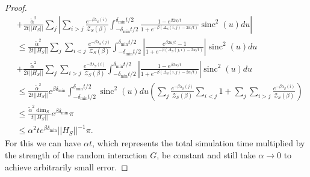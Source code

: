 \documentclass[
 amsmath,amssymb,
 aps,
onecolumn, 
nofootinbib]{revtex4-2}
\newcommand{\abs}[1]{\left| #1 \right|}
\newcommand{\norm}[1]{\left|\left| #1 \right|\right|}
\newcommand{\partfun}{\mathcal{Z}}
\DeclareMathOperator{\sinc}{sinc}
\begin{document}
\begin{proof}
\begin{align}
        &+ \frac{\widetilde{\alpha}^2}{2 t \norm{H_S}} \sum_j  \abs{\sum_{i > j} \frac{e^{-\beta \lambda_S(i)}}{\partfun_S(\beta)} \int_{-\delta_{\min} t /2 }^{\delta_{\min} t/ 2} \frac{1 - e^{\beta 2 u / t}}{1 + e^{-\beta(\Delta_S(i,j) - 2u/t)}} \sinc^2(u) du} \\
        &\le \frac{\widetilde{\alpha}^2}{2 t \norm{H_S}} \sum_j \sum_{i < j} \frac{e^{-\beta \lambda_S(j)}}{\partfun_S(\beta)} \int_{-\delta_{\min} t /2 }^{\delta_{\min} t/ 2}\abs{ \frac{ e^{\beta 2 u / t} - 1}{1 + e^{-\beta(\Delta_S(j, i) - 2u/t)}}} \sinc^2(u) du \nonumber \\
        &+ \frac{\widetilde{\alpha}^2}{2 t \norm{H_S}} \sum_j  \sum_{i > j} \frac{e^{-\beta \lambda_S(i)}}{\partfun_S(\beta)} \int_{-\delta_{\min} t /2 }^{\delta_{\min} t/ 2} \abs{ \frac{1 - e^{\beta 2 u / t}}{1 + e^{-\beta(\Delta_S(i,j) - 2u/t)}} } \sinc^2(u) du \\
        &\le \frac{\widetilde{\alpha}^2}{2 t \norm{H_S}} e^{\beta \delta_{\min}} \int_{-\delta_{\min}t/2}^{\delta_{\min}t /2} \sinc^2(u) du \left(\sum_j \frac{e^{-\beta \lambda_S(j)}}{\partfun_S(\beta)} \sum_{i < j} 1 + \sum_j \sum_{i > j} \frac{e^{-\beta \lambda_S(i)}}{\partfun_S(\beta)}  \right) \\
        &\le \frac{\widetilde{\alpha}^2 \dim_S}{t \norm{H_S}} e^{\beta \delta_{\min}} \pi \\
        &\le \alpha^2 t e^{\beta \delta_{\min}} \norm{H_S}^{-1} \pi.
    \end{align}
    For this we can have $\alpha t$, which represents the total simulation time multiplied by the strength of the random interaction $G$, be constant and still take $\alpha \to 0$ to achieve arbitrarily small error.


\end{proof}
\end{document}

